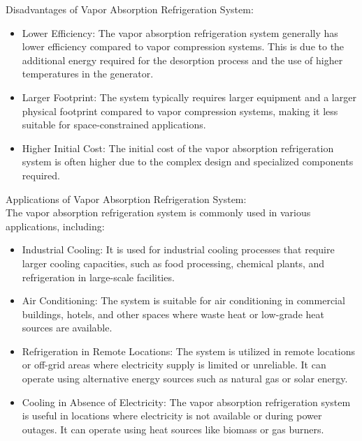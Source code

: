 \documentclass{article}
\begin{document}
Disadvantages of Vapor Absorption Refrigeration System:\\
\begin{itemize}
  \item Lower Efficiency: The vapor absorption refrigeration system generally has lower efficiency compared to vapor compression systems. This is due to the additional energy required for the desorption process and the use of higher temperatures in the generator.
  \item Larger Footprint: The system typically requires larger equipment and a larger physical footprint compared to vapor compression systems, making it less suitable for space-constrained applications.
  \item Higher Initial Cost: The initial cost of the vapor absorption refrigeration system is often higher due to the complex design and specialized components required.
\end{itemize}


Applications of Vapor Absorption Refrigeration System:\\
The vapor absorption refrigeration system is commonly used in various applications, including:\\
\begin{itemize}
  \item Industrial Cooling: It is used for industrial cooling processes that require larger cooling capacities, such as food processing, chemical plants, and refrigeration in large-scale facilities.
  \item Air Conditioning: The system is suitable for air conditioning in commercial buildings, hotels, and other spaces where waste heat or low-grade heat sources are available.
  \item Refrigeration in Remote Locations: The system is utilized in remote locations or off-grid areas where electricity supply is limited or unreliable. It can operate using alternative energy sources such as natural gas or solar energy.
  \item Cooling in Absence of Electricity: The vapor absorption refrigeration system is useful in locations where electricity is not available or during power outages. It can operate using heat sources like biomass or gas burners.
\end{itemize}
\end{document}
